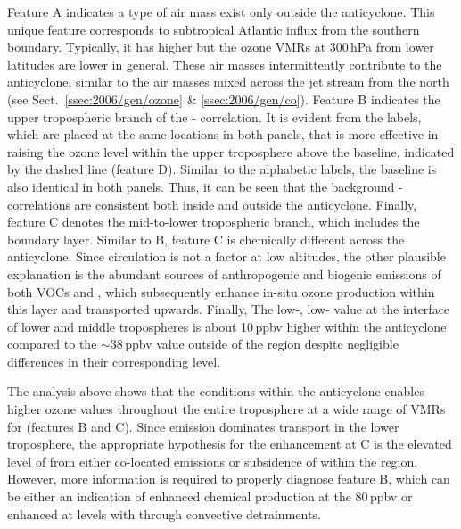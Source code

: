 Feature A indicates a type of air mass exist only outside the anticyclone. This unique feature corresponds to subtropical Atlantic
influx from the southern boundary. Typically, it has higher  but the ozone VMRs at 300\,\unit{hPa} from lower latitudes are
lower in general. These air masses intermittently contribute to the anticyclone, similar to the air masses mixed across the jet stream
from the north (see Sect.~\ref{ssec:2006/gen/ozone} \& \ref{ssec:2006/gen/co}). Feature B indicates the upper tropospheric branch
of the - correlation. It is evident from the labels, which are placed at the same locations in both panels, that
 is more effective in raising the ozone level within the upper troposphere above the baseline, indicated by the dashed
line (feature D). Similar to the alphabetic labels, the baseline is also identical in both panels. Thus, it can be seen that the background
- correlations are consistent both inside and outside the anticyclone. Finally, feature C denotes the mid-to-lower
tropospheric branch, which includes the boundary layer. Similar to B, feature C is chemically different across the anticyclone. Since circulation
is not a factor at low altitudes, the other plausible explanation is the abundant sources of anthropogenic and biogenic emissions of both
VOCs and , which subsequently enhance in-situ ozone production within this layer and transported upwards. Finally,
The low-, low-  value at the interface of lower and middle tropospheres is about 10\,\unit{ppbv} higher within
the anticyclone compared to the $\sim38$\,\unit{ppbv} value outside of the region despite negligible differences in their corresponding
 level.

The analysis above shows that the conditions within the anticyclone enables higher ozone values throughout the entire troposphere at
a wide range of VMRs for  (features B and C). Since emission dominates transport in the lower
troposphere, the appropriate hypothesis for the enhancement at C is the elevated level of  from either co-located
emissions or subsidence of {\lnox} within the region. However, more information is required to properly diagnose feature B, which
can be either an indication of enhanced  chemical production at the 80\,\unit{ppbv}  or enhanced 
at levels with  through convective detrainments.


